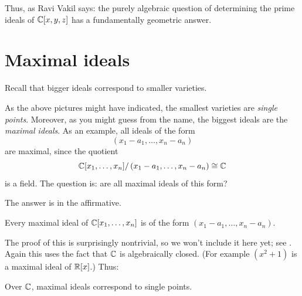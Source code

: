 Thus, as Ravi Vakil \cite{ref:vakil} says:
the purely algebraic question
of determining the prime ideals of $\mathbb C[x,y,z]$
has a fundamentally geometric answer.

\section{Maximal ideals}
Recall that bigger ideals correspond to smaller varieties.

As the above pictures might have indicated,
the smallest varieties are \emph{single points}.
Moreover, as you might guess from the name,
the biggest ideals are the \emph{maximal ideals}.
As an example, all ideals of the form
\[ \left( x_1-a_1, \dots, x_n-a_n \right) \]
are maximal, since the quotient
\[ \mathbb C[x_1, \dots, x_n] / \left( x_1-a_1, \dots, x_n-a_n \right) \cong \mathbb C \]
is a field.
The question is: are all maximal ideals of this form?

The answer is in the affirmative.
\begin{theorem}
	Every maximal ideal of $\mathbb C[x_1, \dots, x_n]$
	is of the form $(x_1-a_1, \dots, x_n-a_n)$.
\end{theorem}
The proof of this is surprisingly nontrivial,
so we won't include it here yet; see \cite[\S7.4.3]{ref:vakil}.
Again this uses the fact that $\mathbb C$ is algebraically closed.
(For example $(x^2+1)$ is a maximal ideal of $\mathbb R[x]$.)
Thus:
\begin{moral}
	Over $\mathbb C$, maximal ideals correspond to single points.
\end{moral}

